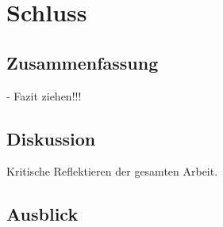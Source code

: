 \chapter{Schluss}
\label{sec:schluss}

\section{Zusammenfassung}
\label{zusammenfassung}
-   Fazit ziehen!!! \\

\section{Diskussion}
\label{diskussion}
Kritische Reflektieren der gesamten Arbeit.
\section{Ausblick}
\label{ausblick}

    \newpage